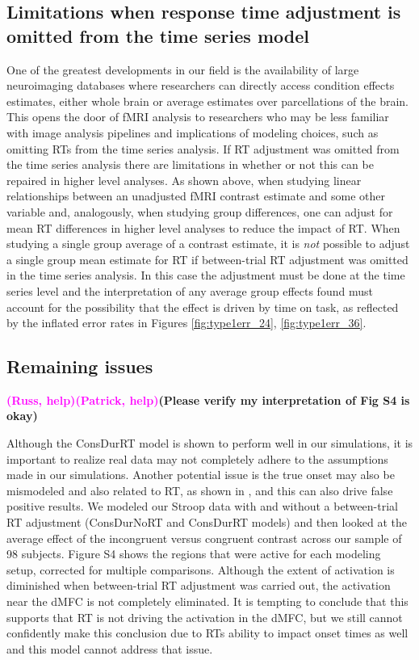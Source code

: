 \documentclass[titlepage,12pt] {article}
\newcommand{\rh}{\textcolor{magenta}{\textbf{(Russ, help)}}}
\newcommand{\ph}{\textcolor{magenta}{\textbf{(Patrick, help)}}}
\begin{document}
\subsection*{Limitations when response time adjustment is omitted from the time series model} 
One of the greatest developments in our field is the availability of large neuroimaging databases where researchers can directly access condition effects estimates, either whole brain or average estimates over parcellations of the brain.  This opens the door of fMRI analysis to researchers who may be less familiar with image analysis pipelines and implications of modeling choices, such as omitting RTs from the time series analysis.  If RT adjustment was omitted from the time series analysis there are limitations in whether or not this can be repaired in higher level analyses.  As shown above, when studying linear relationships between an unadjusted fMRI contrast estimate and some other variable and, analogously, when studying group differences, one can adjust for mean RT differences in higher level analyses to reduce the impact of RT. When studying a single group average of a contrast estimate, it is \emph{not} possible to adjust a single group mean estimate for RT if between-trial RT adjustment was omitted in the time series analysis.  In this case the adjustment must be done at the time series level and the interpretation of any average group effects found must account for the possibility that the effect is driven by time on task, as reflected by the inflated error rates in Figures \ref{fig:type1err_24}, \ref{fig:type1err_36}.  



\subsection*{Remaining issues} 
\rh\ph\textbf{(Please verify my interpretation of Fig S4 is okay)}

Although the ConsDurRT model is shown to perform well in our simulations, it is important to realize real data may not completely adhere to the assumptions made in our simulations.  Another potential issue is the true onset may also be mismodeled and also related to RT, as shown in \citet{yarkoni_bold_2009}, and this can also drive false positive results.  We modeled our Stroop data with and without a between-trial RT adjustment (ConsDurNoRT and ConsDurRT models) and then looked at the average effect of the incongruent versus congruent contrast across our sample of 98 subjects.  Figure S4 shows the regions that were active for each modeling setup, corrected for multiple comparisons.  Although the extent of activation is diminished when between-trial RT adjustment was carried out, the activation near the dMFC is not completely eliminated. It is tempting to conclude that this supports that RT is not driving the activation in the dMFC, but we still cannot confidently make this conclusion due to RTs ability to impact onset times as well and this model cannot address that issue.
\end{document}
